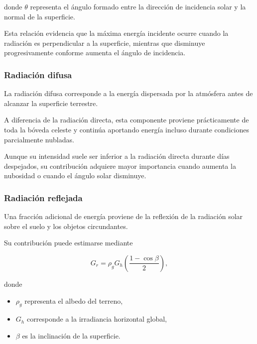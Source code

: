 donde $\theta$ representa el ángulo formado entre la dirección de incidencia solar y la normal de la superficie.

Esta relación evidencia que la máxima energía incidente ocurre cuando la radiación es perpendicular a la superficie, mientras que disminuye progresivamente conforme aumenta el ángulo de incidencia.

\subsubsection{Radiación difusa}

La radiación difusa corresponde a la energía dispersada por la atmósfera antes de alcanzar la superficie terrestre.

A diferencia de la radiación directa, esta componente proviene prácticamente de toda la bóveda celeste y continúa aportando energía incluso durante condiciones parcialmente nubladas.

Aunque su intensidad suele ser inferior a la radiación directa durante días despejados, su contribución adquiere mayor importancia cuando aumenta la nubosidad o cuando el ángulo solar disminuye.

\subsubsection{Radiación reflejada}

Una fracción adicional de energía proviene de la reflexión de la radiación solar sobre el suelo y los objetos circundantes.

Su contribución puede estimarse mediante

\begin{equation}
G_r
=
\rho_g G_h
\left(
\frac{1-\cos\beta}{2}
\right),
\end{equation}

donde

\begin{itemize}

\item $\rho_g$ representa el albedo del terreno,

\item $G_h$ corresponde a la irradiancia horizontal global,

\item $\beta$ es la inclinación de la superficie.
\end{itemize}

